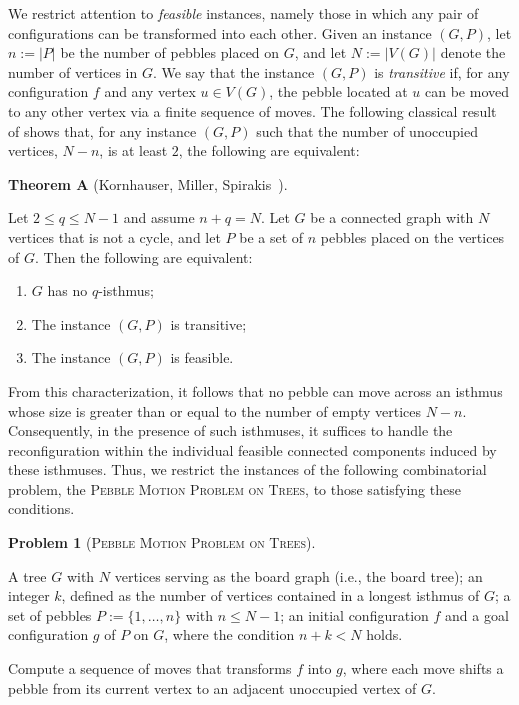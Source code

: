 \documentclass[letter,11pt]{article}
\theoremstyle{definition}
\theoremstyle{definition}
\newtheorem{prob}{Problem}
\newcommand{\1}{\boldmath$~1~$\unboldmath}
\newcommand{\namelistlabel}[1]{\hspace*{10pt}\mbox{#1}:\hspace{\fill}}
\newenvironment{namelist}[1]{%
    \begin{list}{}
      {\let\makelabel\namelistlabel
      \settowidth{\labelwidth}{#1}
      \setlength{\leftmargin}{1.1\labelwidth}
      \setlength{\labelsep}{5pt}
      \setlength{\parsep}{0pt}}
  }{%
  \end{list}}
\begin{document}
We restrict attention to {\it feasible} instances,
namely those in which any pair of configurations can be transformed into each other.
Given an instance $(G, P)$, let $n := |P|$ be the number of pebbles placed on $G$, 
and let $N := |V(G)|$ denote the number of vertices in $G$.
We say that the instance $(G, P)$ is \textit{transitive} if, for any configuration $f$ and 
any vertex $u \in V(G)$, the pebble located at $u$ can be moved to any other vertex via a finite 
sequence of moves.
The following classical result of \cite{715921} shows that,
for any instance $(G, P)$ such that the number of unoccupied vertices, $N - n$, is at least $2$,
the following are equivalent:




\medskip
\noindent
\textbf{Theorem A} (Kornhauser, Miller, Spirakis~\cite{715921}).  {\it{
Let $2 \leq q \leq N - 1$ and assume $n + q = N$.  
Let $G$ be a connected graph with $N$ vertices that is not a cycle, 
and let $P$ be a set of $n$ pebbles placed on the vertices of $G$.  
Then the following are equivalent:
\begin{enumerate}
\item $G$ has no $q$-isthmus;
\item The instance $(G, P)$ is transitive;
\item The instance $(G, P)$ is feasible.
\end{enumerate}}}
\medskip


From this characterization, it follows that no pebble can move across an isthmus
whose size is greater than or equal to the number of empty vertices $N-n$.
Consequently, in the presence of such isthmuses,
it suffices to handle the reconfiguration within the individual
feasible connected components induced by these isthmuses.
Thus, we restrict the instances of the following combinatorial problem,
the \textsc{Pebble Motion Problem on Trees}, to those satisfying these conditions.

\begin{prob}[\textsc{Pebble Motion Problem on Trees}]\label{PMPonTree} \hfill
\begin{namelist}{INSTANCE}
\item[{\it Instance}] \rm
A tree $G$ with $N$ vertices serving as the board graph (i.e., the board tree);  
an integer $k$, defined as the number of vertices contained in a longest isthmus of $G$;  
a set of pebbles $P := \{1, \ldots, n\}$ with $n \le N-1$;  
an initial configuration $f$ and a goal configuration $g$ of $P$ on $G$,  
where the condition $n + k < N$ holds.

\item[{\it Task}] \rm
Compute a sequence of moves that transforms $f$ into $g$, 
where each move shifts a pebble from its current vertex
to an adjacent unoccupied vertex of $G$.
\end{namelist}
\end{prob}
\end{document}
